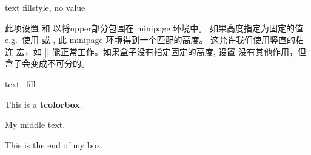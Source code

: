   \begin{docTcbKey}[][doc new=2015-07-15]{text fill}{}{style, no value}
  
  此项设置  和 
  以将upper部分包围在 minipage 环境中。 如果高度指定为固定的值
  e.g.\ 使用  或 , 此 minipage 环境得到一个匹配的高度。 这允许我们使用竖直的粘连%
  宏，如 |\vfill| 能正常工作。如果盒子没有指定固定的高度,%
  设置  没有其他作用，但盒子会变成不可分的。
  \begin{exdispExample}{text_fill}
  \begin{tcolorbox}[colback=red!5!white,colframe=red!75!black,fonttitle=\bfseries,
    height=8cm,text fill,
    title=My filled box]
  This is a \textbf{tcolorbox}.
  \par\vfill
  \begin{center}
    My middle text.
  \end{center}
  \par\vfill
  This is the end of my box.
  \end{tcolorbox}
  \end{exdispExample}
  \end{docTcbKey}

  



